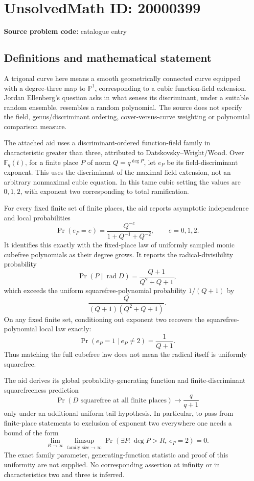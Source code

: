 \documentclass[11pt]{article}
\newcommand{\F}{\mathbb{F}}
\newcommand{\PP}{\mathbb{P}}
\begin{document}
\section*{UnsolvedMath ID: 20000399}
\textbf{Source problem code:} catalogue entry
\subsection{Definitions and mathematical statement}
A trigonal curve here means a smooth geometrically connected curve equipped with a degree-three map to \(\PP^1\), corresponding to a cubic function-field extension. Jordan Ellenberg's question asks in what senses its discriminant, under a suitable random ensemble, resembles a random polynomial. The source does not specify the field, genus/discriminant ordering, cover-versus-curve weighting or polynomial comparison measure.

The attached aid uses a discriminant-ordered function-field family in characteristic greater than three, attributed to Datskovsky--Wright/Wood. Over \(\F_q(t)\), for a finite place \(P\) of norm \(Q=q^{\deg P}\), let \(e_P\) be its field-discriminant exponent. This uses the discriminant of the maximal field extension, not an arbitrary nonmaximal cubic equation. In this tame cubic setting the values are \(0,1,2\), with exponent two corresponding to total ramification.

For every fixed finite set of finite places, the aid reports asymptotic independence and local probabilities
\[
\Pr(e_P=e)=\frac{Q^{-e}}{1+Q^{-1}+Q^{-2}},\qquad e=0,1,2.
\]
It identifies this exactly with the fixed-place law of uniformly sampled monic cubefree polynomials as their degree grows. It reports the radical-divisibility probability
\[
\Pr(P\mid\operatorname{rad}D)=\frac{Q+1}{Q^2+Q+1},
\]
which exceeds the uniform squarefree-polynomial probability \(1/(Q+1)\) by
\[
\frac{Q}{(Q+1)(Q^2+Q+1)}.
\]
On any fixed finite set, conditioning out exponent two recovers the squarefree-polynomial local law exactly:
\[
\Pr(e_P=1\mid e_P\ne2)=\frac1{Q+1}.
\]
Thus matching the full cubefree law does not mean the radical itself is uniformly squarefree.

The aid derives its global probability-generating function and finite-discriminant squarefreeness prediction
\[
\Pr(D\text{ squarefree at all finite places})\longrightarrow\frac q{q+1}
\]
only under an additional uniform-tail hypothesis. In particular, to pass from finite-place statements to exclusion of exponent two everywhere one needs a bound of the form
\[
\lim_{R\to\infty}\limsup_{\text{family size}\to\infty}
\Pr(\exists P:\deg P>R,\ e_P=2)=0.
\]
The exact family parameter, generating-function statistic and proof of this uniformity are not supplied. No corresponding assertion at infinity or in characteristics two and three is inferred.
\end{document}
